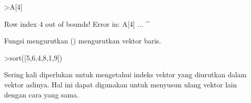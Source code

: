 \documentclass[a4paper,10pt]{article}
\begin{document}
\begin{eulernotebook}
\begin{eulercomment}
\begin{eulercomment}
\begin{eulercomment}
\begin{eulercomment}
\begin{eulerprompt}
>A[4]
\end{eulerprompt}
\begin{euleroutput}
  Row index 4 out of bounds!
  Error in:
  A[4] ...
      ^
\end{euleroutput}
\begin{eulercomment}
Fungsi mengurutkan () mengurutkan vektor baris.
\end{eulercomment}
\begin{eulerprompt}
>sort([5,6,4,8,1,9])
\end{eulerprompt}
\begin{euleroutput}
  [1,  4,  5,  6,  8,  9]
\end{euleroutput}
\begin{eulercomment}
Sering kali diperlukan untuk mengetahui indeks vektor yang diurutkan
dalam vektor aslinya. Hal ini dapat digunakan untuk menyusun ulang
vektor lain dengan cara yang sama.


\end{eulercomment}
\end{eulercomment}
\end{eulercomment}
\end{eulercomment}
\end{eulercomment}
\end{eulernotebook}
\end{document}

